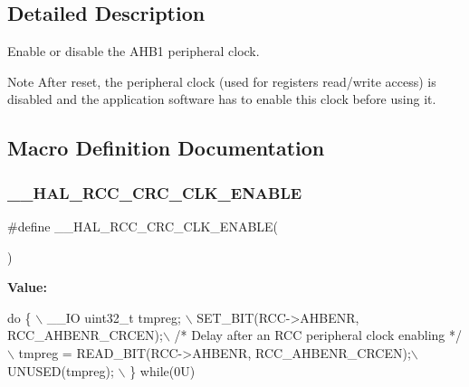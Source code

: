 

\subsection{Detailed Description}
Enable or disable the A\+H\+B1 peripheral clock. 

\begin{DoxyNote}{Note}
After reset, the peripheral clock (used for registers read/write access) is disabled and the application software has to enable this clock before using it. 
\end{DoxyNote}


\subsection{Macro Definition Documentation}
\mbox{\label{group___r_c_c___peripheral___clock___enable___disable_ga5222bac3ebfec517c93055ae065303da}} 
\subsubsection{\texorpdfstring{\+\_\+\+\_\+\+H\+A\+L\+\_\+\+R\+C\+C\+\_\+\+C\+R\+C\+\_\+\+C\+L\+K\+\_\+\+E\+N\+A\+B\+LE}{\_\_HAL\_RCC\_CRC\_CLK\_ENABLE}}
{\footnotesize\ttfamily \#define \+\_\+\+\_\+\+H\+A\+L\+\_\+\+R\+C\+C\+\_\+\+C\+R\+C\+\_\+\+C\+L\+K\+\_\+\+E\+N\+A\+B\+LE(\begin{DoxyParamCaption}{ }\end{DoxyParamCaption})}

{\bfseries Value\+:}
\begin{DoxyCode}
\textcolor{keywordflow}{do} \{ \(\backslash\)
                                        \_\_IO uint32\_t tmpreg; \(\backslash\)
                                        SET\_BIT(RCC->AHBENR, RCC\_AHBENR\_CRCEN);\(\backslash\)
                                        \textcolor{comment}{/* Delay after an RCC peripheral clock enabling */}\(\backslash\)
                                        tmpreg = READ\_BIT(RCC->AHBENR, RCC\_AHBENR\_CRCEN);\(\backslash\)
                                        UNUSED(tmpreg); \(\backslash\)
                                      \} \textcolor{keywordflow}{while}(0U)
\end{DoxyCode}


